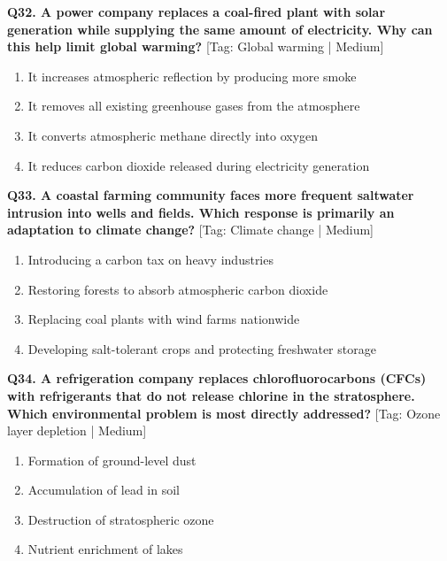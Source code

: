 \noindent\textbf{Q32. A power company replaces a coal-fired plant with solar generation while supplying the same amount of electricity. Why can this help limit global warming?} \hfill [Tag: Global warming | Medium]
\begin{enumerate}[label=(\alph*),topsep=2pt,itemsep=1pt,partopsep=0pt,parsep=0pt]
    \item {It increases atmospheric reflection by producing more smoke}
    \item {It removes all existing greenhouse gases from the atmosphere}
    \item {It converts atmospheric methane directly into oxygen}
    \item {It reduces carbon dioxide released during electricity generation}
\end{enumerate}
\vspace{2mm}

\noindent\textbf{Q33. A coastal farming community faces more frequent saltwater intrusion into wells and fields. Which response is primarily an adaptation to climate change?} \hfill [Tag: Climate change | Medium]
\begin{enumerate}[label=(\alph*),topsep=2pt,itemsep=1pt,partopsep=0pt,parsep=0pt]
    \item {Introducing a carbon tax on heavy industries}
    \item {Restoring forests to absorb atmospheric carbon dioxide}
    \item {Replacing coal plants with wind farms nationwide}
    \item {Developing salt-tolerant crops and protecting freshwater storage}
\end{enumerate}
\vspace{2mm}

\noindent\textbf{Q34. A refrigeration company replaces chlorofluorocarbons (CFCs) with refrigerants that do not release chlorine in the stratosphere. Which environmental problem is most directly addressed?} \hfill [Tag: Ozone layer depletion | Medium]
\begin{enumerate}[label=(\alph*),topsep=2pt,itemsep=1pt,partopsep=0pt,parsep=0pt]
    \item {Formation of ground-level dust}
    \item {Accumulation of lead in soil}
    \item {Destruction of stratospheric ozone}
    \item {Nutrient enrichment of lakes}
\end{enumerate}
\vspace{2mm}

